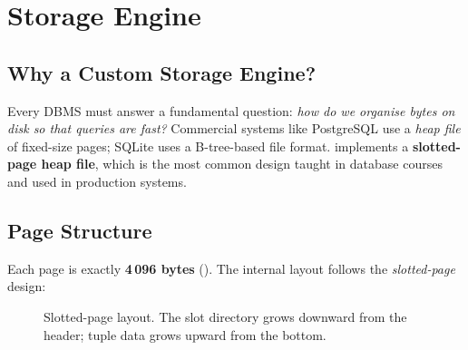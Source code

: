 \chapter{Storage Engine}
\label{ch:storage-engine}

\section{Why a Custom Storage Engine?}

Every DBMS must answer a fundamental question: \emph{how do we organise bytes on disk so that queries are fast?}  Commercial systems like PostgreSQL use a \emph{heap file} of fixed-size pages; SQLite uses a B-tree-based file format.  \shiftdb{} implements a \textbf{slotted-page heap file}, which is the most common design taught in database courses~\cite{ramakrishnan2003database} and used in production systems.

\section{Page Structure}
\label{sec:page-structure}

Each page is exactly \textbf{4\,096 bytes} ().  The internal layout follows the \emph{slotted-page} design:

\begin{figure}[H]
\centering
{}
\caption{Slotted-page layout.  The slot directory grows downward from the header; tuple data grows upward from the bottom.}
\label{fig:slotted-page}
\end{figure}

